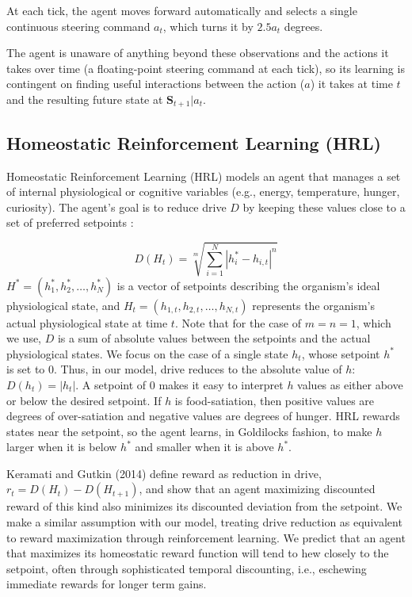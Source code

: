 \documentclass[12pt,fleqn]{article}
\begin{document}
At each tick, the agent moves forward automatically and selects a single continuous steering command $a_t$, which turns it by $2.5a_t$ degrees.

The agent is unaware of anything beyond these observations and the actions it takes over time (a floating-point steering command at each tick), so its learning is contingent on finding useful interactions between the action (\(a\)) it takes at time \(t\) and the resulting future state at \(\mathbf{S}_{t+1}|a_t\).

\subsection{Homeostatic Reinforcement Learning (HRL)}\label{sec:hrl}

Homeostatic Reinforcement Learning (HRL) models an agent that manages a set of internal physiological or cognitive variables (e.g., energy, temperature, hunger, curiosity). The agent's goal is to reduce drive $D$ by keeping these values close to a set of preferred setpoints \cite{keramati_homeostatic_2014}:

\begin{equation}\label{eq:model-drive}
  D\left(H_t\right)=\sqrt[m]{\sum_{i=1}^N\left|h_i^*-h_{i, t}\right|^n}
\end{equation}
\(H^*=\left(h_1^*, h_2^*, \ldots, h_N^*\right)\) is a vector of setpoints describing the organism's ideal physiological state, and \(H_t=\left(h_{1, t}, h_{2, t}, \ldots, h_{N, t}\right)\) represents the organism's actual physiological state at time \(t\). Note that for the case of $m = n = 1$, which we use, $D$ is a sum of absolute values between the setpoints and the actual physiological states. We focus on the case of a single state \(h_t\), whose setpoint \(h^*\) is set to \(0\). Thus, in our model, drive reduces to the absolute value of $h$: \(D(h_t)=|h_t|\). A setpoint of 0 makes it easy to interpret $h$ values as either above or below the desired setpoint. If $h$ is food-satiation, then positive values are degrees of over-satiation and negative values are degrees of hunger. HRL rewards states near the setpoint, so the agent learns, in Goldilocks fashion, to make $h$ larger when it is below \(h^*\) and smaller when it is above \(h^*\).

Keramati and Gutkin (2014) define reward as reduction in drive, $r_t=D(H_t)-D(H_{t+1})$, and show that an agent maximizing discounted reward of this kind also minimizes its discounted deviation from the setpoint. We make a similar assumption with our model, treating drive reduction as equivalent to reward maximization through reinforcement learning. We predict that an agent that maximizes its homeostatic reward function will tend to hew closely to the setpoint, often through sophisticated temporal discounting, i.e., eschewing immediate rewards for longer term gains.
\end{document}
